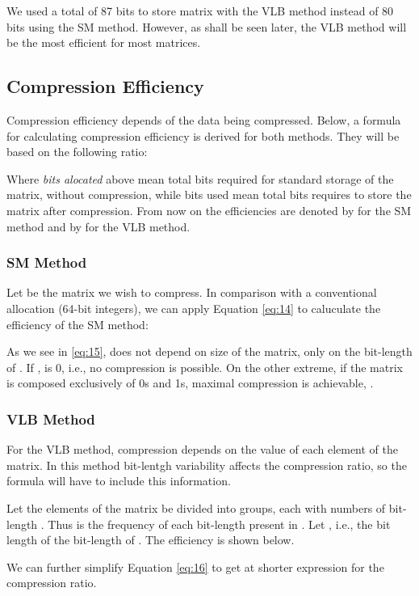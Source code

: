 \documentclass[10pt]{article}
\begin{document}
 We used a total of 87 bits to store matrix  with the VLB method instead of 80 bits using the SM method. However, as shall be seen later, the VLB method will be the most efficient for most matrices.
 
 \subsection*{Compression Efficiency}
 Compression efficiency depends of the data being compressed. Below, a formula for calculating compression efficiency is derived for both methods. They will be based on the following ratio:
 
 
 
 Where \textit{bits alocated} above mean total bits required for standard storage of the matrix, without compression, while bits used mean total bits requires to store the matrix after compression. From now on the efficiencies are denoted by  for the SM method and by  for the VLB method. 
 \subsubsection*{SM Method}
 Let  be the matrix we wish to compress. In comparison with a conventional allocation (64-bit integers), we can apply Equation \ref{eq:14} to caluculate the efficiency of the SM method:



As we see in \ref{eq:15},  does not depend on size of the matrix, only on the bit-length of . If ,  is 0, i.e., no compression is possible. On the other extreme, if the matrix is composed exclusively of 0s and 1s, maximal compression is achievable, .
 
 \subsubsection*{VLB Method}
 
 For the VLB method, compression depends on the value of each element of the matrix. In this method bit-lentgh variability affects the compression ratio, so the formula will have to include this information.

Let the  elements of the matrix  be divided into  groups, each with  numbers of bit-length . Thus  is the frequency of each bit-length present in . Let , i.e., the bit length of the bit-length of . The efficiency  is shown below.



We can further simplify Equation \ref{eq:16} to get at shorter expression for the compression ratio.
\end{document}
